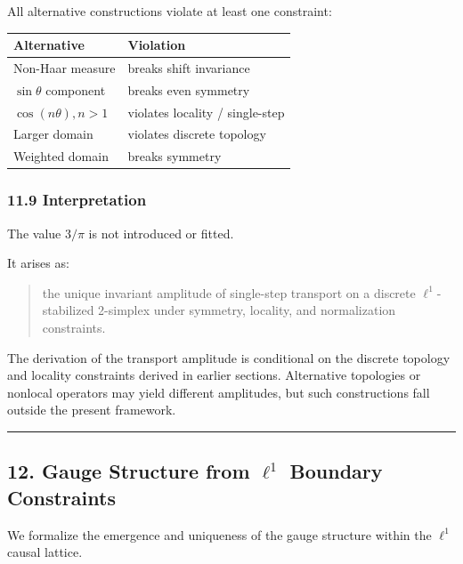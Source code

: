 \documentclass[
]{article}
\begin{document}
All alternative constructions violate at least one constraint:

\begin{longtable}[]{@{}ll@{}}
\toprule\noalign{}
Alternative & Violation \\
\midrule\noalign{}
\endhead
\bottomrule\noalign{}
\endlastfoot
Non-Haar measure & breaks shift invariance \\
\(\sin\theta\) component & breaks even symmetry \\
\(\cos(n\theta), n>1\) & violates locality / single-step \\
Larger domain & violates discrete topology \\
Weighted domain & breaks symmetry \\
\end{longtable}

\subsubsection{11.9 Interpretation}\label{interpretation-2}

The value \(3/\pi\) is not introduced or fitted.

It arises as:

\begin{quote}
the unique invariant amplitude of single-step transport on a discrete
\(\ell^1\)-stabilized 2-simplex under symmetry, locality, and
normalization constraints.
\end{quote}

The derivation of the transport amplitude is conditional on the discrete
topology and locality constraints derived in earlier sections.
Alternative topologies or nonlocal operators may yield different
amplitudes, but such constructions fall outside the present framework.

\begin{center}\rule{0.5\linewidth}{0.5pt}\end{center}

\subsection{\texorpdfstring{12. Gauge Structure from \(\ell^1\) Boundary
Constraints}{12. Gauge Structure from \textbackslash ell\^{}1 Boundary Constraints}}\label{gauge-structure-from-ell1-boundary-constraints}

We formalize the emergence and uniqueness of the gauge structure within
the \(\ell^1\) causal lattice.
\end{document}
